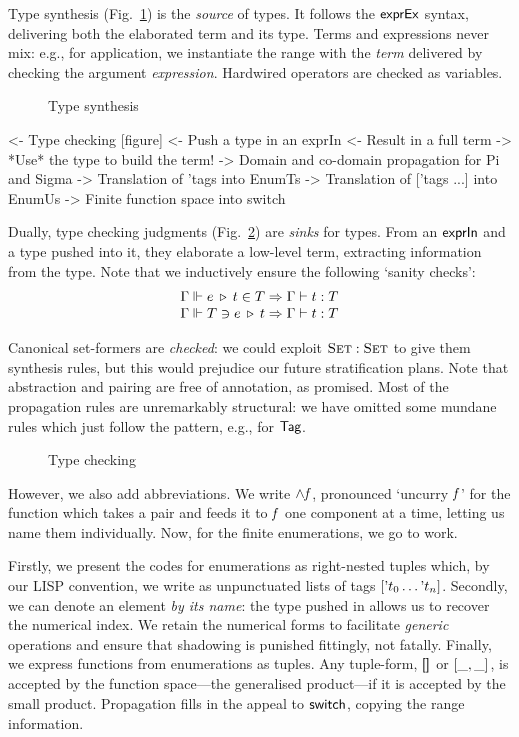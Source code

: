 Type synthesis (Fig.~\ref{fig:type-synthesis}) is the \emph{source} of
types. It follows the \(\textsf{exprEx}\) syntax, delivering both the
elaborated term and its type. Terms and expressions never mix: e.g.,
for application, we instantiate the range with the \emph{term}
delivered by checking the argument \emph{expression}. Hardwired
operators are checked as variables.

\begin{figure}

\caption{Type synthesis}
\label{fig:type-synthesis}
\end{figure}


\begin{wstructure}
<- Type checking [figure]
    <- Push a type in an exprIn
    <- Result in a full term
    -> *Use* the type to build the term!
        -> Domain and co-domain propagation for Pi and Sigma
        -> Translation of 'tags into EnumTs
        -> Translation of ['tags ...] into EnumUs
        -> Finite function space into switch
\end{wstructure}

Dually, type checking judgments (Fig.~\ref{fig:type-checking})
are \emph{sinks} for types. From an
$\textsf{exprIn}$ and a type pushed into it, they elaborate a low-level
term, extracting information from the type. Note that we inductively ensure the following `sanity checks':
%
\[\stkc{
\Gamma\Vdash\propag{e}{\pull{t}{T}} \Rightarrow
  \Gamma\vdash t:T \\
\Gamma\Vdash\push{\propag{e}{t}}{T} \Rightarrow
  \Gamma\vdash t:T
}\]

Canonical set-formers are \emph{checked}: we could exploit
\(\Set:\Set\) to give them synthesis rules, but this would prejudice
our future stratification plans. Note that abstraction and pairing are
free of annotation, as promised. Most of the propagation rules are
unremarkably structural: we have omitted some mundane rules which just
follow the pattern, e.g., for \(\UId\).

\begin{figure}

\caption{Type checking}
\label{fig:type-checking}
\end{figure}

However, we also add abbreviations. We write \(\spl{\M{f}}\),
pronounced `uncurry \(\mathit{f}\)' for the function which takes a pair and
feeds it to \(\mathit{f}\) one component at a time, letting us name
them individually. Now, for the finite enumerations, we go to work.

Firstly, we present the codes for enumerations as right-nested tuples
which, by our LISP convention, we write as unpunctuated lists of tags
\(\sqr{\etag{t_0}\ldots\etag{t_n}}\).
Secondly, we can denote an element \emph{by its
name}: the type pushed in allows us to recover the numerical
index. We retain the numerical forms to facilitate
\emph{generic} operations and ensure that shadowing is punished
fittingly, not fatally.
Finally, we express functions from enumerations as tuples.
Any tuple-form, \(\void\) or \(\pair{\_}{\_}{}\), is accepted by the
function space---the generalised product---if it is accepted by the
small product. Propagation fills in the appeal to $\SYMBswitch$,
copying the range information.

